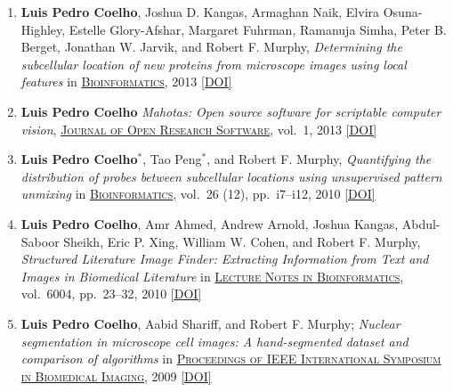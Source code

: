 \documentclass{article}
\newcommand\showdoi[1]{%
    \href{https://doi.org/#1}{[DOI]}%
}
\newcommand\pubname[1]{\textsc{\uline{#1}}}
\newcommand\contribution[1]{\relax}
\newcommand\costar{${}^{*}$}
\begin{document}
\begin{enumerate}[resume]
\item \textbf{Luis Pedro Coelho}, Joshua D. Kangas, Armaghan Naik, Elvira Osuna-Highley, Estelle Glory-Afshar, Margaret Fuhrman, Ramanuja Simha, Peter B. Berget, Jonathan W. Jarvik, and Robert F. Murphy, \emph{Determining the subcellular location of new proteins from microscope images using local features} in \pubname{Bioinformatics}, 2013 \showdoi{10.1093/bioinformatics/btt392}
\contribution{I designed and implemented the proposed algorithm, collected
microscopy data (in collaboration with other authors), and wrote the
manuscript.}

\item \textbf{Luis Pedro Coelho} \emph{Mahotas: Open source software for
scriptable computer vision}, \pubname{Journal of Open Research Software}, vol.\
1, 2013 \showdoi{10.5334/jors.ac}
\contribution{I implemented the underlying computer vision software and the manuscript.}

\item \textbf{Luis Pedro Coelho}\costar, Tao Peng\costar, and Robert F.
Murphy, \emph{Quantifying the distribution of probes between subcellular
locations using unsupervised pattern unmixing} in \pubname{Bioinformatics},
vol.\ 26 (12), pp.\ i7--i12, 2010 \showdoi{10.1093/bioinformatics/btq220}
\contribution{I conceived of and implemented one of the methods presented and
wrote the manuscript.}

\item \textbf{Luis Pedro Coelho}, Amr Ahmed, Andrew Arnold, Joshua Kangas,
Abdul-Saboor Sheikh, Eric P. Xing, William W. Cohen, and Robert F. Murphy,
\emph{Structured Literature Image Finder: Extracting Information from Text and
Images in Biomedical Literature} in \pubname{Lecture Notes in Bioinformatics},
vol.\ 6004, pp.\ 23--32, 2010 \showdoi{10.1007/978-3-642-13131-8_4}
\contribution{With the paper below, this forms a package on the SLIF project,
where I enhanced the image analysis pipeline (for the analysis of figures in
published scientific literature). I wrote the first draft of this manuscript
and helped draft the one below.}

\item \textbf{Luis Pedro Coelho}, Aabid Shariff, and Robert F. Murphy;
\emph{Nuclear segmentation in microscope cell images: A hand-segmented dataset
and comparison of algorithms} in \pubname{Proceedings of IEEE International
Symposium in Biomedical Imaging}, 2009 \showdoi{10.1109/ISBI.2009.5193098}
\contribution{I acquired (part of) the microscopy data, built the
hand-segmented dataset, implemented the methods and wrote the first draft of
the manuscript.}


\end{enumerate}
\end{document}
